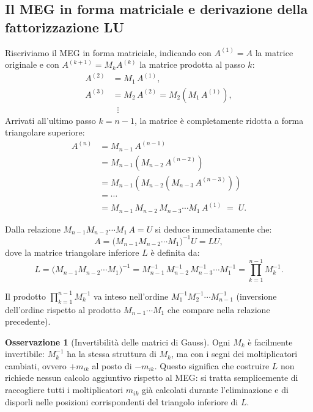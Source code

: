 \documentclass[a4paper,12pt]{article}
\theoremstyle{definition}
\newtheorem{osservazione}{Osservazione}[section]
\theoremstyle{remark}
\begin{document}
\subsection{Il MEG in forma matriciale e derivazione della fattorizzazione LU}

Riscriviamo il MEG in forma matriciale, indicando con $A^{(1)} = A$ la matrice originale e con
$A^{(k+1)} = M_k A^{(k)}$ la matrice prodotta al passo $k$:
\begin{align*}
  A^{(2)} &= M_1\,A^{(1)}, \\
  A^{(3)} &= M_2\,A^{(2)} = M_2\!\left(M_1\,A^{(1)}\right), \\
  &\;\;\vdots
\end{align*}
Arrivati all'ultimo passo $k = n-1$, la matrice è completamente ridotta a forma triangolare
superiore:
\begin{align*}
  A^{(n)} &= M_{n-1}\,A^{(n-1)} \\
           &= M_{n-1}\!\left(M_{n-2}\,A^{(n-2)}\right) \\
           &= M_{n-1}\!\left(M_{n-2}\!\left(M_{n-3}\,A^{(n-3)}\right)\right) \\
           &= \cdots \\
           &= M_{n-1}\,M_{n-2}\,M_{n-3}\cdots M_1\,A^{(1)} \;=\; U.
\end{align*}

Dalla relazione $M_{n-1}M_{n-2}\cdots M_1\,A = U$ si deduce immediatamente che:
\[
  A = \bigl(M_{n-1}M_{n-2}\cdots M_1\bigr)^{-1} U = LU,
\]
dove la matrice triangolare inferiore $L$ è definita da:
\[
  L = \bigl(M_{n-1}M_{n-2}\cdots M_1\bigr)^{-1}
    = M_{n-1}^{-1}\,M_{n-2}^{-1}\,M_{n-3}^{-1}\cdots M_1^{-1}
    = \prod_{k=1}^{n-1} M_k^{-1}.
\]

Il prodotto $\prod_{k=1}^{n-1} M_k^{-1}$ va inteso nell'ordine
$M_1^{-1} M_2^{-1} \cdots M_{n-1}^{-1}$
(inversione dell'ordine rispetto al prodotto $M_{n-1}\cdots M_1$ che compare nella relazione
precedente).

\begin{osservazione}[Invertibilità delle matrici di Gauss]
Ogni $M_k$ è facilmente invertibile: $M_k^{-1}$ ha la stessa struttura di $M_k$, ma con i segni
dei moltiplicatori cambiati, ovvero $+m_{ik}$ al posto di $-m_{ik}$. Questo significa che
costruire $L$ non richiede nessun calcolo aggiuntivo rispetto al MEG: si tratta semplicemente di
raccogliere tutti i moltiplicatori $m_{ik}$ già calcolati durante l'eliminazione e di disporli nelle
posizioni corrispondenti del triangolo inferiore di $L$.
\end{osservazione}
\end{document}
